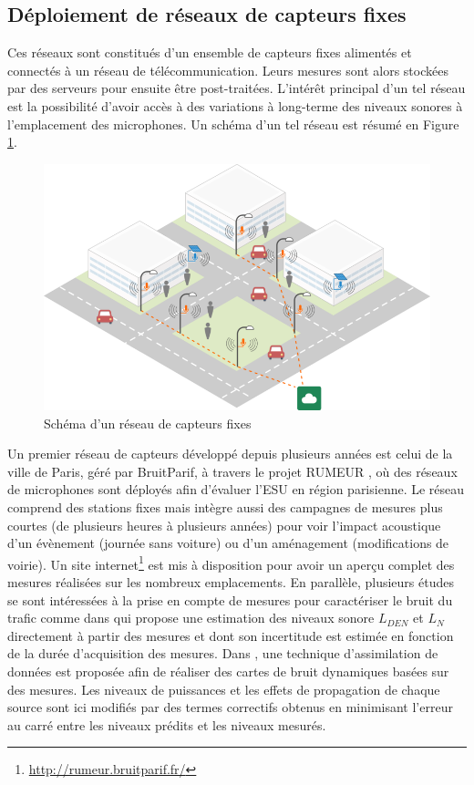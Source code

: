 \subsection{Déploiement de réseaux de capteurs fixes}

Ces réseaux sont constitués d'un ensemble de capteurs fixes alimentés et connectés à un réseau de télécommunication. Leurs mesures sont alors stockées par des serveurs pour ensuite être post-traitées. L'intérêt principal d'un tel réseau est la possibilité d'avoir accès à des variations à long-terme des niveaux sonores à l'emplacement des microphones. Un schéma d'un tel réseau est résumé en Figure \ref{fig:reseau_capteur}.

\begin{figure}[t]
\centering
\includegraphics[width=0.8\linewidth]{./figures/cartographie/reseau_mesure.png}
\caption[Schéma d'un réseau de capteurs fixes]{Schéma d'un réseau de capteurs fixes\protect\footnotemark}
\label{fig:reseau_capteur}
\end{figure}


Un premier réseau de capteurs développé depuis plusieurs années est celui de la ville de Paris, géré par BruitParif, à travers le projet RUMEUR \cite{mietlicki2012innovative}, où des réseaux de microphones sont déployés afin d'évaluer l'ESU en région parisienne. Le réseau comprend des stations fixes mais intègre aussi des campagnes de mesures plus courtes (de plusieurs heures à plusieurs années) pour voir l'impact acoustique d'un évènement (journée sans voiture) ou d'un aménagement (modifications de voirie). Un site internet\footnote{\url{http://rumeur.bruitparif.fr/}} est mis à disposition pour avoir un aperçu complet des mesures réalisées sur les nombreux emplacements.
En parallèle, plusieurs études se sont intéressées à la prise en compte de mesures pour caractériser le bruit du trafic comme dans \cite{makarewicz_empirical_2011} qui propose une estimation des niveaux sonore $L_{DEN}$ et $L_N$ directement à partir des mesures et dont son incertitude est estimée en fonction de la durée d'acquisition des mesures. Dans \cite{wei_dynamic_2016}, une technique d'assimilation de données est proposée afin de réaliser des cartes de bruit dynamiques basées sur des mesures. Les niveaux de puissances et les effets de propagation de chaque source sont ici modifiés par des termes correctifs obtenus en minimisant l'erreur au carré entre les niveaux prédits et les niveaux mesurés.

